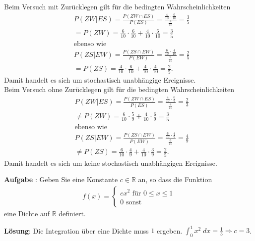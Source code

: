 \documentclass[a4paper,13pt]{scrartcl}
\newcommand{\exercise}{\vspace*{0.2cm}
\stepcounter{aufgabe}
\noindent
\textbf{Aufgabe \arabic{aufgabe}}: }
\newcounter{aufgabe}
\newcommand{\solution}{\vspace*{0.2cm}
\noindent
\textbf{Lösung}: }
\begin{document}
Beim Versuch mit Zurücklegen gilt für die bedingten Wahrscheinlichkeiten 
\begin{align*}
    & P(ZW|ES) = \frac{P(ZW \cap ES)}{P(ES)} = \frac{\frac{4}{10} \cdot \frac{6}{10}}{\frac{4}{10}} = \frac{3}{5}\\
    & = P(ZW) = \frac{6}{10} \cdot \frac{6}{10} + \frac{4}{10} \cdot \frac{6}{10} = \frac{3}{5}\\
    & \text{ebenso wie}\\
    & P(ZS|EW) = \frac{P(ZS \cap EW)}{P(EW)} = \frac{\frac{6}{10} \cdot \frac{4}{10}}{\frac{6}{10}} = \frac{2}{5}\\
    & = P(ZS) = \frac{4}{10} \cdot \frac{6}{10} + \frac{4}{10} \cdot \frac{4}{10} = \frac{2}{5} \text{.}
\end{align*}
Damit handelt es sich um stochastisch unabhängige Ereignisse.\\
Beim Versuch ohne Zurücklegen gilt für die bedingten Wahrscheinlichkeiten
\begin{align*}
    & P(ZW|ES) = \frac{P(ZW \cap ES)}{P(ES)} = \frac{\frac{4}{10} \cdot \frac{6}{9}}{\frac{4}{10}} = \frac{2}{3}\\
    & \neq P(ZW) = \frac{6}{10} \cdot \frac{5}{9} + \frac{4}{10} \cdot \frac{6}{9} = \frac{3}{5}\\
    & \text{ebenso wie}\\
    & P(ZS|EW) = \frac{P(ZS \cap EW)}{P(EW)} = \frac{\frac{6}{10} \cdot \frac{4}{9}}{\frac{6}{10}} = \frac{4}{9}\\
    & \neq P(ZS) = \frac{6}{10} \cdot \frac{4}{9} + \frac{4}{10} \cdot \frac{3}{9} = \frac{2}{5} \text{.}
\end{align*}
Damit handelt es sich um keine stochastisch unabhängigen Ereignisse.
\vspace{8mm}


\exercise
Geben Sie eine Konstante $c  \in \mathbb{R}$ an, so dass die Funktion 
\begin{align*}
f(x) = \begin{cases} c x^2 \text{ für }  0\leq x \leq 1 \\ 0 \text{ sonst}\end{cases}
\end{align*}
eine Dichte auf $\mathbb{R}$ definiert.
\vspace{4mm}

\solution
Die Integration über eine Dichte muss $1$ ergeben.  
$\int_0^1 x^2 \; dx = \frac{1}{3} \Rightarrow c = 3$.
\vspace{8mm}
\end{document}
